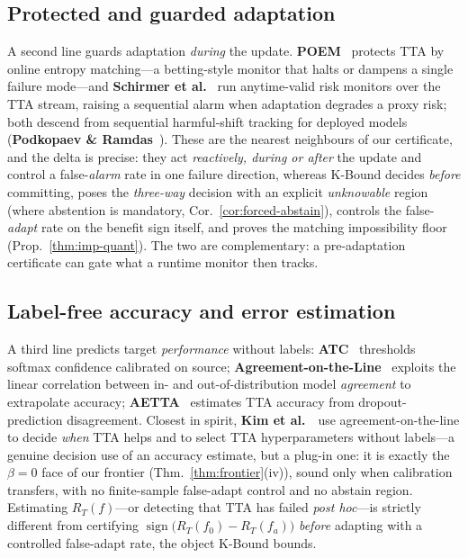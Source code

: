 \documentclass[conference]{IEEEtran}
\theoremstyle{plain}
\theoremstyle{definition}
\newcommand{\sign}{\operatorname{sign}}
\begin{document}
\subsection{Protected and guarded adaptation}
A second line guards adaptation \emph{during} the update. \textbf{POEM}~\cite{bar2024poem}
protects TTA by online entropy matching---a betting-style monitor that halts or dampens a
single failure mode---and \textbf{Schirmer et al.}~\cite{schirmer2025monitoring} run anytime-valid risk monitors over the
TTA stream, raising a sequential alarm when adaptation degrades a proxy risk; both descend
from sequential harmful-shift tracking for deployed models (\textbf{Podkopaev \& Ramdas}~\cite{podkopaev2022tracking}).
These are the nearest neighbours of our certificate, and the delta is precise: they act
\emph{reactively, during or after} the update and control a false-\emph{alarm} rate in one
failure direction, whereas K-Bound decides \emph{before} committing, poses the
\emph{three-way} decision with an explicit \emph{unknowable} region (where abstention is
mandatory, Cor.~\ref{cor:forced-abstain}), controls the false-\emph{adapt} rate on the
benefit sign itself, and proves the matching impossibility floor
(Prop.~\ref{thm:imp-quant}). The two are complementary: a pre-adaptation certificate can
gate what a runtime monitor then tracks.

\subsection{Label-free accuracy and error estimation}
A third line predicts target \emph{performance} without labels: \textbf{ATC}~\cite{garg2022atc} thresholds
softmax confidence calibrated on source; \textbf{Agreement-on-the-Line}~\cite{baek2022aol,miller2021aol} exploits the linear
correlation between in- and out-of-distribution model \emph{agreement} to extrapolate
accuracy; \textbf{AETTA}~\cite{lee2024aetta} estimates TTA accuracy from dropout-prediction disagreement.
Closest in spirit, \textbf{Kim et al.}~\cite{kim2024taol}\ use agreement-on-the-line to decide \emph{when} TTA
helps and to select TTA hyperparameters without labels---a genuine decision use of an
accuracy estimate, but a plug-in one: it is exactly the $\beta{=}0$ face of our frontier
(Thm.~\ref{thm:frontier}(iv)), sound only when calibration transfers, with no finite-sample
false-adapt control and no abstain region.
Estimating $R_T(f)$---or detecting that TTA has failed \emph{post hoc}---is strictly different
from certifying $\sign\big(R_T(f_0)-R_T(f_a)\big)$ \emph{before} adapting with a controlled
false-adapt rate, the object K-Bound bounds.
\end{document}
